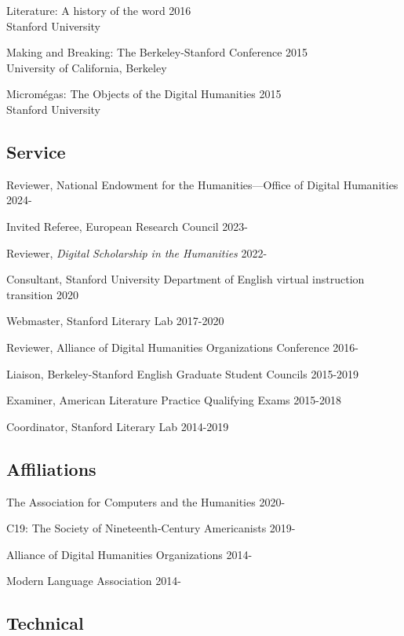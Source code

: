 \documentclass[
  12pt,
  letterpaper,
]{article}
\begin{document}
Literature: A history of the word \hfill 2016\\
Stanford University

Making and Breaking: The Berkeley-Stanford Conference \hfill 2015\\
University of California, Berkeley

Micromégas: The Objects of the Digital Humanities \hfill 2015\\
Stanford University

\hypertarget{service}{%
\subsection{Service}\label{service}}

Reviewer, National Endowment for the Humanities—Office of Digital Humanities \hfill 2024-

Invited Referee, European Research Council \hfill 2023-

Reviewer, \emph{Digital Scholarship in the Humanities} \hfill 2022-

Consultant, Stanford University Department of English virtual
instruction transition \hfill 2020

Webmaster, Stanford Literary Lab \hfill 2017-2020

Reviewer, Alliance of Digital Humanities Organizations Conference
\hfill 2016-

Liaison, Berkeley-Stanford English Graduate Student Councils
\hfill 2015-2019

Examiner, American Literature Practice Qualifying Exams \hfill 2015-2018

Coordinator, Stanford Literary Lab \hfill 2014-2019

\hypertarget{affiliations}{%
\subsection{Affiliations}\label{affiliations}}

The Association for Computers and the Humanities \hfill 2020-

C19: The Society of Nineteenth-Century Americanists \hfill 2019-

Alliance of Digital Humanities Organizations \hfill 2014-

Modern Language Association \hfill 2014-

\hypertarget{technical}{%
\subsection{Technical}\label{technical}}
\end{document}
